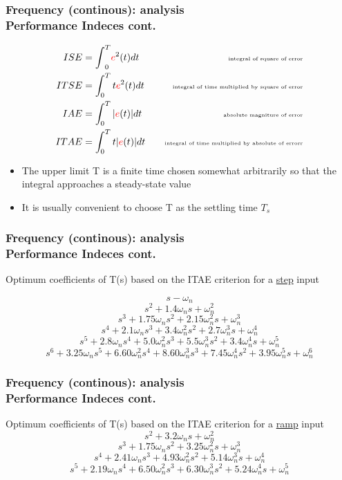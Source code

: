 \documentclass[hyperref={pdfpagelabels=true}]{beamer}
\begin{document}
\begin{frame}
\frametitle{Frequency (continous): analysis \\ {\large Performance Indeces cont.}}
\begin{align*}
ISE&=\textbf{$\int$}_0^T \textcolor{red}{e}^2(t)dt \quad & \tiny{\text{integral of square of error}} \\
ITSE&=\int_0^T t\textcolor{red}{e}^2(t)dt \quad & \tiny{\text{ integral of time multiplied by square of error}} \\
IAE&=\int_0^T |\textcolor{red}{e}(t)|dt \quad & \tiny{\text{absolute magniture of error}} \\
ITAE&=\int_0^T t|\textcolor{red}{e}(t)|dt \quad & \tiny{\text{integral of time multiplied by absolute of errorr}} \\
\end{align*}
\begin{itemize}
\item The upper limit T is a finite time chosen somewhat arbitrarily so
that the integral approaches a steady-state value
\item It is usually convenient to choose T as the settling time $T_s$
\end{itemize}
\end{frame}

\begin{frame}
\frametitle{Frequency (continous): analysis \\ {\large Performance Indeces cont.}}
Optimum coefficients of T(s) based on the ITAE criterion for a {\underline{step}} input

$$s-\omega_n$$
$$s^2 + 1.4\omega_ns + \omega_n^2$$
$$s^3 + 1.75\omega_ns^2 + 2.15\omega_n^2s + \omega_n^3$$
$$s^4 + 2.1\omega_ns^3 + 3.4\omega_n^2s^2 + 2.7\omega_n^3s + \omega_n^4$$
$$s^5 + 2.8\omega_ns^4 + 5.0\omega_n^2s^3 + 5.5\omega_n^3s^2 + 3.4\omega_n^4s + \omega_n^5$$
$$s^6 + 3.25\omega_ns^5 + 6.60\omega_n^2s^4 + 8.60\omega_n^3s^3 + 7.45\omega_n^4s^2 + 3.95\omega_n^5s + \omega_n^6$$
\end{frame}

\begin{frame}
\frametitle{Frequency (continous): analysis \\ {\large Performance Indeces cont.}}
Optimum coefficients of T(s) based on the ITAE criterion for a {\underline{ramp}} input
$$s^2 + 3.2\omega_ns + \omega_n^2$$
$$s^3 + 1.75\omega_ns^2 + 3.25\omega_n^2s + \omega_n^3$$
$$s^4 + 2.41\omega_ns^3 + 4.93\omega_n^2s^2 + 5.14\omega_n^3s + \omega_n^4$$
$$s^5 + 2.19\omega_ns^4 + 6.50\omega_n^2s^3 + 6.30\omega_n^3s^2 + 5.24\omega_n^4s + \omega_n^5$$
\end{frame}
\end{document}
